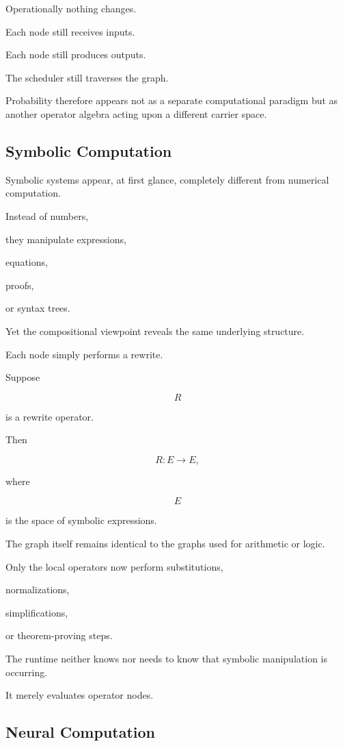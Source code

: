 \documentclass[12pt,oneside]{article}
\begin{document}
Operationally nothing changes.

Each node still receives inputs.

Each node still produces outputs.

The scheduler still traverses the graph.

Probability therefore appears not as a separate computational paradigm but as another operator algebra acting upon a different carrier space.

\subsection{Symbolic Computation}

Symbolic systems appear, at first glance, completely different from numerical computation.

Instead of numbers,

they manipulate expressions,

equations,

proofs,

or syntax trees.

Yet the compositional viewpoint reveals the same underlying structure.

Each node simply performs a rewrite.

Suppose

\[
R
\]

is a rewrite operator.

Then

\[
R:E\rightarrow E,
\]

where

\[
E
\]

is the space of symbolic expressions.

The graph itself remains identical to the graphs used for arithmetic or logic.

Only the local operators now perform substitutions,

normalizations,

simplifications,

or theorem-proving steps.

The runtime neither knows nor needs to know that symbolic manipulation is occurring.

It merely evaluates operator nodes.

\subsection{Neural Computation}
\end{document}
